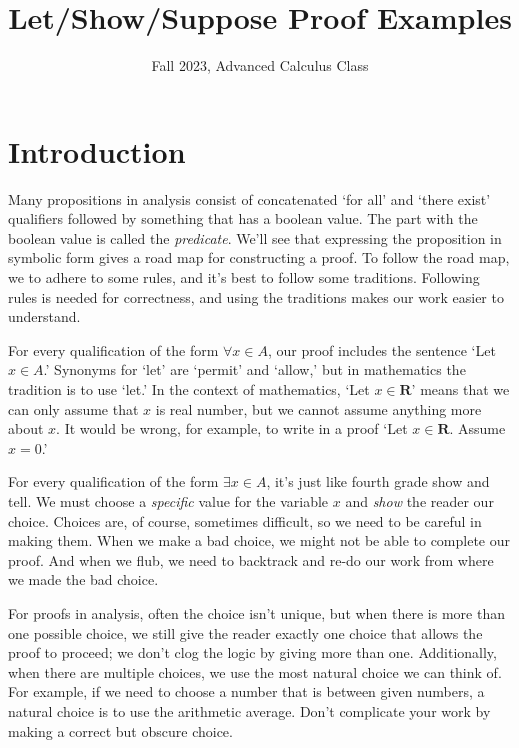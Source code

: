 \documentclass[12pt,fleqn]{article}
\title{Let/Show/Suppose Proof Examples}
\author{Fall 2023, Advanced Calculus Class}
\newcommand{\reals}{\mathbf{R}}
\begin{document}
\maketitle

\section{Introduction}

Many propositions in analysis consist of concatenated `for all' and `there exist'  qualifiers followed by something that has a boolean value.  
The part with the boolean value is called the \emph{predicate}. We'll see that expressing the proposition in symbolic 
form gives a road map for constructing  a proof. To follow the road map, we to 
adhere to some rules, and it's best to follow some traditions.  Following rules is 
needed for correctness,  and using the  traditions makes 
 our work easier to understand.

For every qualification of the form $\forall x \in A$, our proof includes the sentence `Let $x \in A$.'  Synonyms  for  `let' 
are `permit' and `allow,' but in mathematics the tradition is to use `let.' In the context of mathematics, `Let $x \in \reals$' means that we can only assume that $x$ is real number, but we cannot assume anything more about $x$. It would be wrong, for example, to write in a proof  
`Let $x \in \reals$. Assume $x = 0$.'

For every qualification of the form $\exists x \in A$, it's just like fourth grade show and tell. We must choose a \emph{specific} value for the 
variable $x$ and \emph{show} the reader our choice. Choices are, of course, sometimes difficult, so we need to be careful in making them. When we make a bad choice, we might not be able to complete our proof. 
And when we flub, we need to backtrack and re-do our work from where
we made the bad choice.

For proofs in analysis, often the choice isn't unique, but when there is more than one possible choice,
we still give the reader exactly one choice that allows the proof to proceed; we don't clog the logic by giving more than one.
Additionally, when there are multiple choices, we use the most natural choice we can think of. For example, if we need to choose a number that is between
given numbers, a natural choice is to use the arithmetic average. Don't complicate your work by making a correct but obscure choice.
\end{document}
